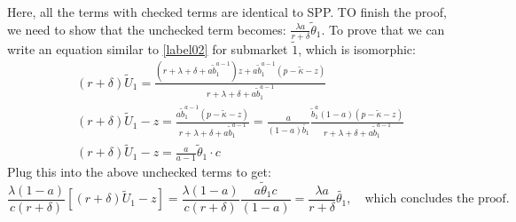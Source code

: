 \documentclass[12pt]{article} %
\theoremstyle{definition}
\begin{document}
Here, all the terms with checked terms are identical to SPP. TO finish the proof, we need to show that the unchecked term becomes: $\frac{\lambda a}{r+\delta} \tilde{\theta}_1.$ To prove that we can write an equation similar to \ref{label02} for submarket $\tilde{1}$, which is isomorphic:
\begin{eqnarray*}
&& (r+\delta) \tilde{U}_1 = \frac{(r+\lambda+\delta+a \tilde{b}_1^{a-1})z + a \tilde{b}_1^{a-1}(p-\tilde{\kappa}-z)}{r+\lambda+\delta+a \tilde{b}_1^{a-1}} \\
&& (r+\delta) \tilde{U}_1 - z = \frac{a \tilde{b}_1^{a-1}(p-\tilde{\kappa}-z)}{r+\lambda+\delta+a \tilde{b}_1^{a-1}} = \frac{a}{(1-a)\tilde{b_1}} \frac{\tilde{b}_1^{a}(1-a)(p-\tilde{\kappa}-z)}{r+\lambda+\delta+a \tilde{b}_1^{a-1}} \\
&& (r+\delta) \tilde{U}_1 - z = \frac{a}{a-1}\tilde{\theta}_1 \cdot c
\end{eqnarray*}
Plug this into the above unchecked terms to get: 
$$\frac{\lambda(1-a)}{c(r+\delta)}[(r+\delta)\tilde{U}_1 - z]=\frac{\lambda(1-a)}{c(r+\delta)}\frac{a \tilde{\theta}_1c}{(1-a)}=\frac{\lambda a}{r+\delta}\tilde{\theta_1}, \quad \text{which concludes the proof.}$$
\end{document}
